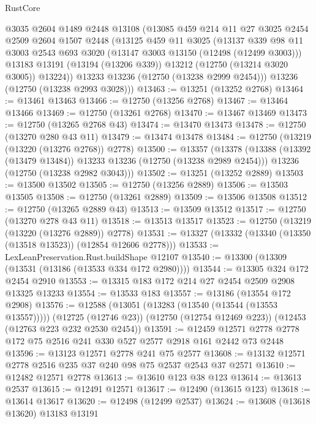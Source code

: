 \begin{lexlean}{RustCore}
\begin{coremodule}
      @3035
      @2604
      @1489
      @2448
      @13108
      (@13085
        @459
        @214
        @11
        @27
        @3025
        @2454
        @2509
        @2604
        @1507
        @2448
        (@13125
          @459
          @11
          @3025
          (@13137
            @339
            @98
            @11
            @3003
            @2543
            @693
            @3020
            (@13147 @3003 @13150 (@12498 (@12499 @3003)))
            @13183
            @13191
            (@13194 (@13206 @339))
            @13212
            (@12750 (@13214 @3020 @3005))
            @13224))
        @13233
        @13236
        (@12750 (@13238 @2999 @2454)))
      @13236
      (@12750 (@13238 @2993 @3028)))
@13463 := @13251 (@13252 @2768)
@13464 := @13461 @13463
@13466 := @12750 (@13256 @2768)
@13467 := @13464 @13466
@13469 := @12750 (@13261 @2768)
@13470 := @13467 @13469
@13473 := @12750 (@13265 @2768 @43)
@13474 := @13470 @13473
@13478 := @12750 (@13270 @280 @43 @11)
@13479 := @13474 @13478
@13484 := @12750 (@13219 (@13220 (@13276 @2768)) @2778)
@13500 := @13357
    (@13378
      (@13388 (@13392 (@13479 @13484)) @13233 @13236 (@12750 (@13238 @2989 @2454)))
      @13236
      (@12750 (@13238 @2982 @3043)))
@13502 := @13251 (@13252 @2889)
@13503 := @13500 @13502
@13505 := @12750 (@13256 @2889)
@13506 := @13503 @13505
@13508 := @12750 (@13261 @2889)
@13509 := @13506 @13508
@13512 := @12750 (@13265 @2889 @43)
@13513 := @13509 @13512
@13517 := @12750 (@13270 @278 @43 @11)
@13518 := @13513 @13517
@13523 := @12750 (@13219 (@13220 (@13276 @2889)) @2778)
@13531 := @13327 (@13332 (@13340 (@13350 (@13518 @13523)) (@12854 @12606 @2778)))
@13533 := LexLeanPreservation.Rust.buildShape @12107
@13540 := @13300 (@13309 (@13531 (@13186 (@13533 @334 @172 @2980))))
@13544 := @13305 @324 @172 @2454 @2910
@13553 := @13315 @183 @172 @214 @27 @2454 @2509 @2908 @13325 @13233
@13554 := @13533 @183
@13557 := @13186 (@13554 @172 @2908)
@13576 := @12588
    (@13051 (@13283 (@13540 (@13544 (@13553 @13557)))))
    (@12725 (@12746 @23))
    (@12750 (@12754 @12469 @223))
    (@12453 (@12763 @223 @232 @2530 @2454))
@13591 := @12459 @12571 @2778 @2778 @172 @75 @2516 @241 @330 @527 @2577 @2918 @161 @2442 @73 @2448
@13596 := @13123 @12571 @2778 @241 @75 @2577
@13608 := @13132 @12571 @2778 @2516 @235 @37 @240 @98 @75 @2537 @2543 @37 @2571
@13610 := @12482 @12571 @2778
@13613 := @13610 @123 @38 @123
@13614 := @13613 @2537
@13615 := @12491 @12571
@13617 := @12490 (@13615 @123)
@13618 := @13614 @13617
@13620 := @12498 (@12499 @2537)
@13624 := @13608 (@13618 @13620) @13183 @13191

\end{coremodule}
\end{lexlean}
